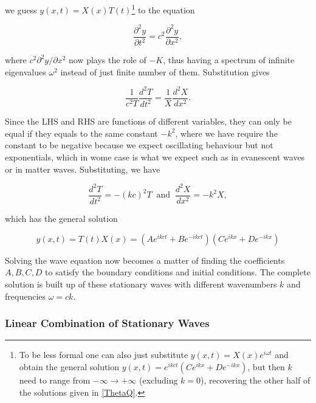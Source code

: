 \documentclass[a4paper,12pt]{report}
\begin{document}
we guess \(y(x,t) = X(x)T(t)\)\footnote{To be less formal one can also just substitute \(y(x,t) = X(x)e^{i \omega t} \) and obtain the general solution \(y(x,t) = e^{ikct}(Ce^{ikx}+De^{-ikx})\), but then \(k\) need to range from \(- \infty \to + \infty\) (excluding \(k = 0\)), recovering the other half of the solutions given in \cref{ThetaQ}.} to the equation 

\begin{equation}
	\frac{\partial^2 y}{\partial t^2} = c^2 \frac{\partial^2 y}{\partial x^2}, 
\end{equation}

where \(c^2 \partial ^2 y/\partial x^2 \) now plays the role of \(-K\), thus having a spectrum of infinite eigenvalues \(\omega ^2\) instead of just finite number of them. Substitution gives

\begin{equation}
	\frac{1}{c^2 T} \frac{d^2T}{dt^2} = \frac{1}{X}\frac{d^2X}{dx^2}.
\end{equation}

Since the LHS and RHS are functions of different variables, they can only be equal if they equals to the same constant \(-k^2 \), where we have require the constant to be negative because we expect oscillating behaviour but not exponentials, which in wome case is what we expect such as in evanescent waves or in matter waves. Substituting, we have

\begin{equation}
	\frac{d^2T }{dt^2} = -(k c)^2T ~\text { and }~ \frac{d^2X}{dx^2} = -k ^2X,
\end{equation}

which has the general solution

\begin{equation}\label{ThetaQ}   
	y(x,t) = T(t)X(x) = \left( Ae^{ik ct}+Be^{-ik ct}    \right)\left( Ce^{i k x}+De^{-i k x}   \right) 
\end{equation}

Solving the wave equation now becomes a matter of finding the coefficients \(A, B, C, D\) to satisfy the boundary conditions and initial conditions. The complete solution is built up of these stationary waves with different wavenumbers \(k\) and frequencies \(\omega = ck\). 

\subsubsection{Linear Combination of Stationary Waves}
\end{document}
